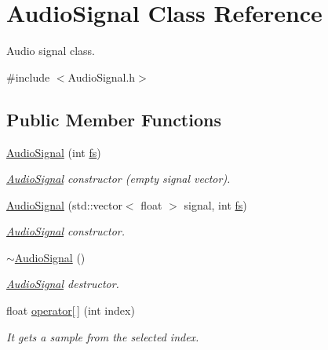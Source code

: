 \hypertarget{class_audio_signal}{}\section{Audio\+Signal Class Reference}
\label{class_audio_signal}


Audio signal class.  




{\ttfamily \#include $<$Audio\+Signal.\+h$>$}

\subsection*{Public Member Functions}
\begin{DoxyCompactItemize}
\item 
\hyperlink{class_audio_signal_a72df7e0c092777d7b829ee7229d5d6f8}{Audio\+Signal} (int \hyperlink{class_audio_signal_acc2dc31d0dc3ca222df68a88c00cf2c9}{fs})
\begin{DoxyCompactList}\small\item\em \hyperlink{class_audio_signal}{Audio\+Signal} constructor (empty signal vector). \end{DoxyCompactList}\item 
\hyperlink{class_audio_signal_a755ad45352e2b260a2ee7fde2440a486}{Audio\+Signal} (std\+::vector$<$ float $>$ signal, int \hyperlink{class_audio_signal_acc2dc31d0dc3ca222df68a88c00cf2c9}{fs})
\begin{DoxyCompactList}\small\item\em \hyperlink{class_audio_signal}{Audio\+Signal} constructor. \end{DoxyCompactList}\item 
\mbox{\label{class_audio_signal_afb379d0c192ec109f8469a118c81b5f5}} 
\hyperlink{class_audio_signal_afb379d0c192ec109f8469a118c81b5f5}{$\sim$\+Audio\+Signal} ()
\begin{DoxyCompactList}\small\item\em \hyperlink{class_audio_signal}{Audio\+Signal} destructor. \end{DoxyCompactList}\item 
float \hyperlink{class_audio_signal_a92f6f979d43fe72d965e17b86dd82e79}{operator\mbox{[}$\,$\mbox{]}} (int index)
\begin{DoxyCompactList}\small\item\em It gets a sample from the selected index. \end{DoxyCompactList}\item 

\end{DoxyCompactItemize}

